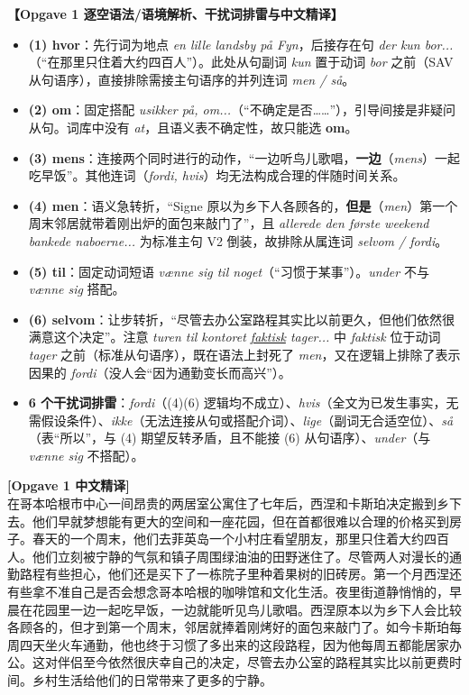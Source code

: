\begin{answerbox}
\textbf{\color{NCDNavy}【Opgave 1 逐空语法/语境解析、干扰词排雷与中文精译】}
\begin{itemize}
  \item \textbf{(1) hvor}：先行词为地点 \textit{en lille landsby på Fyn}，后接存在句 \textit{der kun bor...}（“在那里只住着大约四百人”）。此处从句副词 \textit{kun} 置于动词 \textit{bor} 之前（SAV 从句语序），直接排除需接主句语序的并列连词 \textit{men / så}。
  \item \textbf{(2) om}：固定搭配 \textit{usikker på, om...}（“不确定是否……”），引导间接是非疑问从句。词库中没有 \textit{at}，且语义表不确定性，故只能选 \textbf{om}。
  \item \textbf{(3) mens}：连接两个同时进行的动作，“一边听鸟儿歌唱，\textbf{一边}（\textit{mens}）一起吃早饭”。其他连词（\textit{fordi, hvis}）均无法构成合理的伴随时间关系。
  \item \textbf{(4) men}：语义急转折，“Signe 原以为乡下人各顾各的，\textbf{但是}（\textit{men}）第一个周末邻居就带着刚出炉的面包来敲门了”，且 \textit{allerede den første weekend bankede naboerne...} 为标准主句 V2 倒装，故排除从属连词 \textit{selvom / fordi}。
  \item \textbf{(5) til}：固定动词短语 \textit{vænne sig til noget}（“习惯于某事”）。\textit{under} 不与 \textit{vænne sig} 搭配。
  \item \textbf{(6) selvom}：让步转折，“尽管去办公室路程其实比以前更久，但他们依然很满意这个决定”。注意 \textit{turen til kontoret \underline{faktisk} tager...} 中 \textit{faktisk} 位于动词 \textit{tager} 之前（标准从句语序），既在语法上封死了 \textit{men}，又在逻辑上排除了表示因果的 \textit{fordi}（没人会“因为通勤变长而高兴”）。
  \item \textbf{6 个干扰词排雷}：\textit{fordi}（(4)(6) 逻辑均不成立）、\textit{hvis}（全文为已发生事实，无需假设条件）、\textit{ikke}（无法连接从句或搭配介词）、\textit{lige}（副词无合适空位）、\textit{så}（表“所以”，与 (4) 期望反转矛盾，且不能接 (6) 从句语序）、\textit{under}（与 \textit{vænne sig} 不搭配）。
\end{itemize}

\textbf{\color{NCDTeal}[Opgave 1 中文精译]}\\
在哥本哈根市中心一间昂贵的两居室公寓住了七年后，西涅和卡斯珀决定搬到乡下去。他们早就梦想能有更大的空间和一座花园，但在首都很难以合理的价格买到房子。春天的一个周末，他们去菲英岛一个小村庄看望朋友，那里只住着大约四百人。他们立刻被宁静的气氛和镇子周围绿油油的田野迷住了。尽管两人对漫长的通勤路程有些担心，他们还是买下了一栋院子里种着果树的旧砖房。第一个月西涅还有些拿不准自己是否会想念哥本哈根的咖啡馆和文化生活。夜里街道静悄悄的，早晨在花园里一边一起吃早饭，一边就能听见鸟儿歌唱。西涅原本以为乡下人会比较各顾各的，但才到第一个周末，邻居就捧着刚烤好的面包来敲门了。如今卡斯珀每周四天坐火车通勤，他也终于习惯了多出来的这段路程，因为他每周五都能居家办公。这对伴侣至今依然很庆幸自己的决定，尽管去办公室的路程其实比以前更费时间。乡村生活给他们的日常带来了更多的宁静。


\end{answerbox}
